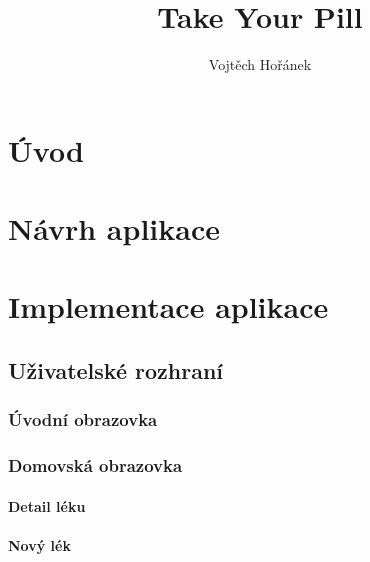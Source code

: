 \documentclass[a4paper,12pt]{report}
\title{Take Your Pill}
\author{Vojtěch Hořánek}
\begin{document}






\renewcommand\cftsecafterpnum{\vskip10pt}
\renewcommand\cftsubsecafterpnum{\vskip10pt}
\renewcommand\cftsubsubsecafterpnum{\vskip10pt}
\newpage
\tableofcontents %

\chapter*{Úvod}



\chapter{Návrh aplikace}


\chapter{Implementace aplikace}


\section{Uživatelské rozhraní}


\subsection{Úvodní obrazovka}


\subsection{Domovská obrazovka}


\subsubsection{Detail léku}


\subsubsection{Nový lék}

\end{document}
